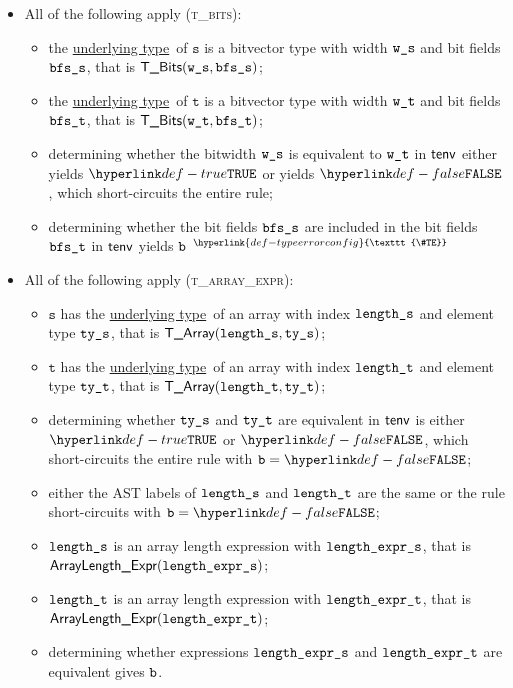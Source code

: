 \documentclass{book}
\newcommand\TypeErrorConfig[0]{\hyperlink{def-typeerrorconfig}{\texttt{\#TE}}}
\newcommand\ProseOrTypeError[0]{\hyperlink{def-proseortypeerror}{$^{\TypeErrorConfig}$}}
\newcommand\underlyingtype[0]{\hyperlink{def-underlyingtype}{underlying type}}
\newcommand\vt[0]{\texttt{t}}
\newcommand\vs[0]{\texttt{s}}
\begin{document}
\begin{itemize}
\item All of the following apply (\textsc{t\_bits}):
  \begin{itemize}
  \item the \underlyingtype\ of $\vs$ is a bitvector type with width $\texttt{w\_s}$ and bit fields $\texttt{bfs\_s}$, that is $\textsf{T\_Bits}(\texttt{w\_s}, \texttt{bfs\_s})$;
  \item the \underlyingtype\ of $\vt$ is a bitvector type with width $\texttt{w\_t}$ and bit fields $\texttt{bfs\_t}$, that is $\textsf{T\_Bits}(\texttt{w\_t}, \texttt{bfs\_t})$;
  \item determining whether the bitwidth $\texttt{w\_s}$ is equivalent to $\texttt{w\_t}$ in $\textsf{tenv}$ either yields $\True$ or yields $\False$,
        which short-circuits the entire rule;
  \item determining whether the bit fields $\texttt{bfs\_s}$ are included in the bit fields $\texttt{bfs\_t}$ in $\textsf{tenv}$ yields $\texttt{b}$ \ProseOrTypeError
  \end{itemize}

\item All of the following apply (\textsc{t\_array\_expr}):
  \begin{itemize}
  \item $\vs$ has the \underlyingtype\ of an array with index $\texttt{length\_s}$ and element type $\texttt{ty\_s}$, that is $\textsf{T\_Array}(\texttt{length\_s}, \texttt{ty\_s})$;
  \item $\vt$ has the \underlyingtype\ of an array with index $\texttt{length\_t}$ and element type $\texttt{ty\_t}$, that is $\textsf{T\_Array}(\texttt{length\_t}, \texttt{ty\_t})$;
  \item determining whether $\texttt{ty\_s}$ and $\texttt{ty\_t}$ are equivalent in $\textsf{tenv}$ is either $\True$
  or $\False$, which short-circuits the entire rule with $\vb=\False$;
  \item either the AST labels of $\texttt{length\_s}$ and $\texttt{length\_t}$ are the same or the rule short-circuits with $\vb=\False$;
  \item $\texttt{length\_s}$ is an array length expression with $\texttt{length\_expr\_s}$, that is \\ $\textsf{ArrayLength\_Expr}(\texttt{length\_expr\_s})$;
  \item $\texttt{length\_t}$ is an array length expression with $\texttt{length\_expr\_t}$, that is \\ $\textsf{ArrayLength\_Expr}(\texttt{length\_expr\_t})$;
  \item determining whether expressions $\texttt{length\_expr\_s}$ and $\texttt{length\_expr\_t}$ are equivalent gives $\texttt{b}$.
  \end{itemize}


\end{itemize}
\end{document}
